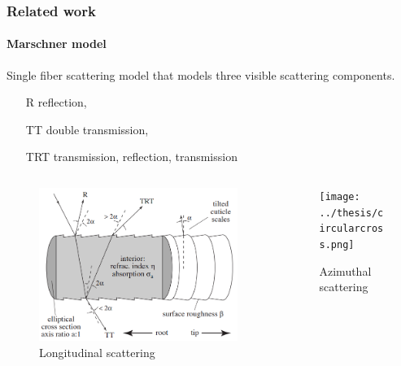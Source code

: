 \documentclass{beamer}
\begin{document}
    \begin{frame}
    \frametitle{Related work}
    \framesubtitle{Marschner model}
    Single fiber scattering model that models three visible scattering components.
    \begin{itemize}
    \centering
    \item[R] reflection,
    \item[TT] double transmission,
    \item[TRT] transmission, reflection, transmission
    \end{itemize}
    
    \begin{columns}[onlytextwidth]
    \begin{column}{.45\textwidth}
    \begin{figure}
    	\includegraphics[scale=0.20]{../thesis/images/marschner_model_longitudinal.png}
    	\caption{Longitudinal scattering}
    \end{figure}
    \end{column}
    \hfill
    \begin{column}{.45\textwidth}
    \begin{figure}
    	\texttt{[image: ../thesis/circularcross.png]}
    	\caption{Azimuthal scattering}
    \end{figure}
    \end{column}
    \end{columns}
  \end{frame}
  
\end{document}
